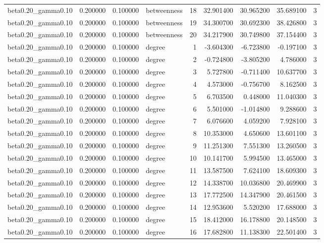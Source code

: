 \begin{tabular}{lrrlrrrrr}
beta0.20\_gamma0.10 & 0.200000 & 0.100000 & betweenness & 18 & 32.901400 & 30.965200 & 35.689100 & 3 \\
beta0.20\_gamma0.10 & 0.200000 & 0.100000 & betweenness & 19 & 34.300700 & 30.692300 & 38.426800 & 3 \\
beta0.20\_gamma0.10 & 0.200000 & 0.100000 & betweenness & 20 & 34.217900 & 30.749800 & 37.154400 & 3 \\
beta0.20\_gamma0.10 & 0.200000 & 0.100000 & degree & 1 & -3.604300 & -6.723800 & -0.197100 & 3 \\
beta0.20\_gamma0.10 & 0.200000 & 0.100000 & degree & 2 & -0.724800 & -3.805200 & 4.786000 & 3 \\
beta0.20\_gamma0.10 & 0.200000 & 0.100000 & degree & 3 & 5.727800 & -0.711400 & 10.637700 & 3 \\
beta0.20\_gamma0.10 & 0.200000 & 0.100000 & degree & 4 & 4.573000 & -0.756700 & 8.162500 & 3 \\
beta0.20\_gamma0.10 & 0.200000 & 0.100000 & degree & 5 & 6.703500 & 0.448000 & 11.040300 & 3 \\
beta0.20\_gamma0.10 & 0.200000 & 0.100000 & degree & 6 & 5.501000 & -1.014800 & 9.288600 & 3 \\
beta0.20\_gamma0.10 & 0.200000 & 0.100000 & degree & 7 & 6.076600 & 4.059200 & 7.928100 & 3 \\
beta0.20\_gamma0.10 & 0.200000 & 0.100000 & degree & 8 & 10.353000 & 4.650600 & 13.601100 & 3 \\
beta0.20\_gamma0.10 & 0.200000 & 0.100000 & degree & 9 & 11.251300 & 7.551300 & 13.260500 & 3 \\
beta0.20\_gamma0.10 & 0.200000 & 0.100000 & degree & 10 & 10.141700 & 5.994500 & 13.465000 & 3 \\
beta0.20\_gamma0.10 & 0.200000 & 0.100000 & degree & 11 & 13.587500 & 7.624100 & 18.609300 & 3 \\
beta0.20\_gamma0.10 & 0.200000 & 0.100000 & degree & 12 & 14.338700 & 10.036800 & 20.469900 & 3 \\
beta0.20\_gamma0.10 & 0.200000 & 0.100000 & degree & 13 & 17.772500 & 14.347900 & 20.461500 & 3 \\
beta0.20\_gamma0.10 & 0.200000 & 0.100000 & degree & 14 & 12.953600 & 5.520200 & 17.688000 & 3 \\
beta0.20\_gamma0.10 & 0.200000 & 0.100000 & degree & 15 & 18.412000 & 16.178800 & 20.148500 & 3 \\
beta0.20\_gamma0.10 & 0.200000 & 0.100000 & degree & 16 & 17.682800 & 11.138300 & 22.501400 & 3 \\

\end{tabular}
